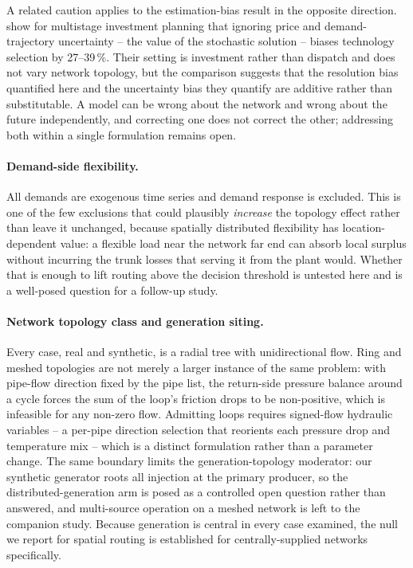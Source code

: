 A related caution applies to the estimation-bias result in the opposite direction.
\citet{Koek2026} show for multistage investment planning that ignoring price and
demand-trajectory uncertainty -- the value of the stochastic solution -- biases technology
selection by 27--39\,\%. Their setting is investment rather than dispatch and does not
vary network topology, but the comparison suggests that the resolution bias quantified
here and the uncertainty bias they quantify are additive rather than substitutable. A
model can be wrong about the network and wrong about the future independently, and
correcting one does not correct the other; addressing both within a single formulation
remains open.

\paragraph{Demand-side flexibility.}
All demands are exogenous time series and demand response is excluded. This is one of the
few exclusions that could plausibly \emph{increase} the topology effect rather than leave
it unchanged, because spatially distributed flexibility has location-dependent value: a
flexible load near the network far end can absorb local surplus without incurring the
trunk losses that serving it from the plant would. Whether that is enough to lift routing
above the decision threshold is untested here and is a well-posed question for a follow-up
study.

\paragraph{Network topology class and generation siting.}
Every case, real and synthetic, is a radial tree with unidirectional flow. Ring and meshed
topologies are not merely a larger instance of the same problem: with pipe-flow direction
fixed by the pipe list, the return-side pressure balance around a cycle forces the sum of
the loop's friction drops to be non-positive, which is infeasible for any non-zero flow.
Admitting loops requires signed-flow hydraulic variables -- a per-pipe direction selection
that reorients each pressure drop and temperature mix -- which is a distinct formulation
rather than a parameter change. The same boundary limits the generation-topology
moderator: our synthetic generator roots all injection at the primary producer, so the
distributed-generation arm is posed as a controlled open question rather than answered,
and multi-source operation on a meshed network is left to the companion study. Because
generation is central in every case examined, the null we report for spatial routing is
established for centrally-supplied networks specifically.

